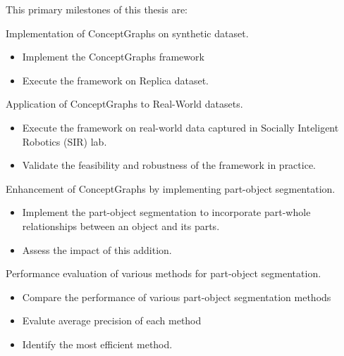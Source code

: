 This primary milestones of this thesis are:
\begin{compactenum}[1.]
\item	Implementation of ConceptGraphs on synthetic dataset.
\begin{itemize}
    \item Implement the ConceptGraphs framework
    \item Execute the framework on Replica dataset.
\end{itemize}
\item	Application of ConceptGraphs to Real-World datasets.
\begin{itemize}
    \item Execute the framework on real-world data captured in Socially Inteligent Robotics (SIR) lab.
    \item Validate the feasibility and robustness of the framework in practice.
\end{itemize}
\item	Enhancement of ConceptGraphs by implementing part-object segmentation.
\begin{itemize}
    \item Implement the part-object segmentation to incorporate part-whole relationships between an object and its parts.
    \item Assess the impact of this addition.
\end{itemize}
\item	Performance evaluation of various methods for part-object segmentation.
\begin{itemize}
    \item Compare the performance of various part-object segmentation methods
    \item Evalute average precision of each method
    \item Identify the most efficient method.
\end{itemize}
\end{compactenum}
